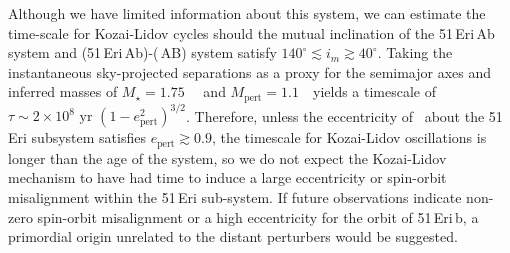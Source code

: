 Although we have limited information about this system, we can
estimate the time-scale for Kozai-Lidov cycles should the mutual
inclination of the 51\,Eri\,Ab system and (51\,Eri\,Ab)-(\thisstarsix\,AB)
system satisfy $ 140^\circ \lesssim i_m  \gtrsim 40^\circ$. 
Taking the instantaneous sky-projected separations as a
proxy for the semimajor axes and inferred masses of
$M_\star=1.75$~\msun\  \citep{Simon11} and $M_\textrm{pert} = 1.1$~\msun\ yields a
timescale of
$\tau \sim 2\times10^8 \textrm{ yr }(1-e_\textrm{pert}^2)^{3/2}$.
Therefore, unless the eccentricity
of \thisstarsix\ about the 51\,Eri subsystem satisfies
$e_\textrm{pert}\gtrsim 0.9$, the timescale for Kozai-Lidov oscillations
is longer than the age of the system,
so we do not expect the Kozai-Lidov mechanism to have had
time to induce a large eccentricity or spin-orbit misalignment
within the 51\,Eri sub-system. If future
observations indicate non-zero spin-orbit misalignment or a high
eccentricity for the orbit of 51\,Eri\,b, a primordial origin unrelated to
the distant perturbers would be suggested.


